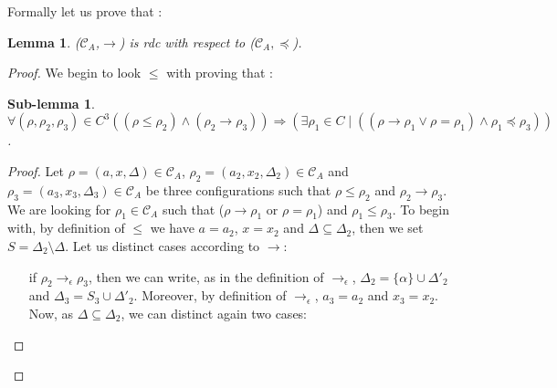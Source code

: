 \documentclass[a4paper,10pt]{report}
\newtheorem{lm}{Lemma}
\newtheorem{slm}{Sub-lemma}[lm]
\theoremstyle{remark}
\newcommand{\C}{\mathcal{C}_{A}}
\begin{document}
Formally let us prove that :

\begin{lm} \label{cd4}
  ($\C$,$\rightarrow$) is rdc with respect to ($\C,\preceq$).
\end{lm}


\begin{proof}
  We begin to look $\leq$ with proving that :
  \begin{slm}
  $\forall (\rho,\rho_2,\rho_3) \in C^3  ((\rho \leq \rho_2) \wedge (\rho_2 \rightarrow \rho_3)) \Rightarrow (\exists \rho_1 \in C \mid ((\rho \rightarrow \rho_1 \vee \rho = \rho_1) \wedge \rho_1 \preceq \rho_3))$.
 
  \end{slm}
   \begin{proof}
   Let $\rho = (a,x,\Delta) \in \C$, $\rho_2 = (a_2,x_2,\Delta_2) \in \C$ and $\rho_3 = (a_3,x_3,\Delta_3) \in \C$ be three configurations 
   such that $\rho \leq \rho_2$ and $\rho_2 \rightarrow \rho_3$. We are looking for $\rho_1 \in \C$ such that ($\rho \rightarrow \rho_1$ or $\rho = \rho_1$) and $\rho_1 \leq \rho_3$.
   To begin with, by definition of $\leq$ we have $a = a_2$, $x= x_2$ and $\Delta \subseteq \Delta_2$, then we set $S = \Delta_2 \setminus \Delta$. Let us distinct cases according to $\rightarrow$: 
   \begin{itemize}
    \item [if $\rho_2 \rightarrow_{\epsilon} \rho_3$,] 
    then we can write, as in the definition of $\rightarrow_{\epsilon}$,  $\Delta_2 = \{\alpha \} \cup \Delta'_2$ and $\Delta_3 = S_3 \cup \Delta'_2 $.
    Moreover, by definition of $\rightarrow_{\epsilon}$, $a_3 = a_2$ and $x_3 = x_2$.
    Now, as $\Delta \subseteq \Delta_2$, we can distinct again two cases:


\end{itemize}
\end{proof}
\end{proof}
\end{document}
